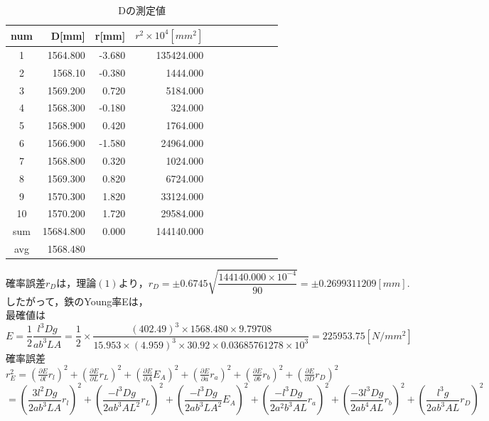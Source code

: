 \documentclass[a4paper,1pt]{jsarticle}
\begin{document}
\begin{table}[H]
  \caption{Dの測定値}
  \label{table:SpeedOfLight}
  \centering
  \begin{tabular}{|c||r|r|r|r|r|r|r|r|r|r|}
    \hline
    num & D[mm] & r[mm] & $r^2\times10^4[mm^2]$ \\
    \hline\hline
    1 & 1564.800 & -3.680  & 135424.000 \\
    2 & 1568.10 & -0.380  & 1444.000 \\
    3 & 1569.200 & 0.720  & 5184.000 \\
    4 & 1568.300 & -0.180  & 324.000 \\
    5 & 1568.900 & 0.420  & 1764.000 \\
    6 & 1566.900 & -1.580  & 24964.000 \\
    7 & 1568.800 & 0.320  & 1024.000 \\
    8 & 1569.300 & 0.820  & 6724.000 \\
    9 & 1570.300 & 1.820  & 33124.000 \\
    10 & 1570.200 & 1.720  & 29584.000 \\
    \hline\hline
    sum & 15684.800  & 0.000  & 144140.000 \\
    \hline
    avg  & 1568.480 &  &  \\

    \hline
  \end{tabular}

\end{table}

$確率誤差r_Dは，理論(1)より，r_D=\pm0.6745\sqrt{\dfrac{144140.000\times10^{-4}}{90}}=\pm0.2699311209[mm].$\\

したがって，鉄のYoung率Eは，\\

最確値は$E=\dfrac{1}{2}\dfrac{l^3Dg}{ab^3LA}=\dfrac{1}{2}\times\dfrac{(402.49)^3\times1568.480\times9.79708}{15.953\times(4.959)^3\times30.92\times0.03685761278\times10^{3}}=225953.75[N/mm^2]$\\

確率誤差$r_E^2=(\frac{\partial E}{\partial l}r_{l})^2+(\frac{\partial E}{\partial L}r_{L})^2+(\frac{\partial E}{\partial A}E_{A})^2+(\frac{\partial E}{\partial a}r_{a})^2+(\frac{\partial E}{\partial b}r_{b})^2+(\frac{\partial E}{\partial D}r_{D})^2$\\

$=(\dfrac{3l^2Dg}{2ab^3LA}r_l)^2+(\dfrac{-l^3Dg}{2ab^3AL^2}r_L)^2+(\dfrac{-l^3Dg}{2ab^3LA^2}E_A)^2+(\dfrac{-l^3Dg}{2a^2b^3AL}r_a)^2+(\dfrac{-3l^3Dg}{2ab^4AL}r_b)^2+(\dfrac{l^3g}{2ab^3AL}r_D)^2$\\
\end{document}
